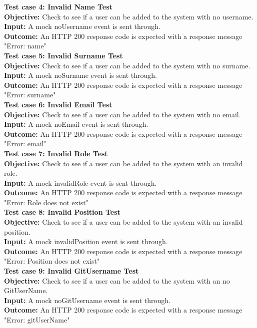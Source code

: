 \documentclass[11pt,a4paper]{article}
\begin{document}
\textbf{Test case 4: Invalid Name Test} \\
\textbf{Objective: } Check to see if a user can be added to the system with no username. \\
\textbf{Input: }  A mock noUsername event is sent through.\\
\textbf{Outcome: } An HTTP 200 response code is expected with a response message "Error: name" \\

\textbf{Test case 5: Invalid Surname Test} \\
\textbf{Objective: } Check to see if a user can be added to the system with no surname. \\
\textbf{Input: }  A mock noSurname event is sent through.\\
\textbf{Outcome: } An HTTP 200 response code is expected with a response message "Error: surname" \\

\textbf{Test case 6: Invalid Email Test} \\
\textbf{Objective: } Check to see if a user can be added to the system with no email. \\
\textbf{Input: }  A mock noEmail event is sent through.\\
\textbf{Outcome: } An HTTP 200 response code is expected with a response message "Error: email" \\

\textbf{Test case 7: Invalid Role Test} \\
\textbf{Objective: } Check to see if a user can be added to the system with an invalid role. \\
\textbf{Input: }  A mock invalidRole event is sent through.\\
\textbf{Outcome: } An HTTP 200 response code is expected with a response message "Error: Role does not exist" \\


\textbf{Test case 8: Invalid Position Test} \\
\textbf{Objective: } Check to see if a user can be added to the system with an invalid position. \\
\textbf{Input: }  A mock invalidPosition event is sent through.\\
\textbf{Outcome: } An HTTP 200 response code is expected with a response message "Error: Position does not exist" \\


\textbf{Test case 9: Invalid GitUsername Test} \\
\textbf{Objective: } Check to see if a user can be added to the system with an no GitUserName. \\
\textbf{Input: }  A mock noGitUsername event is sent through.\\
\textbf{Outcome: } An HTTP 200 response code is expected with a response message "Error: gitUserName" \\
\end{document}
